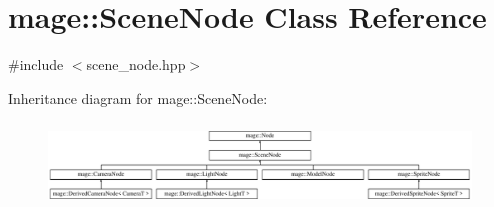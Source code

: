 \hypertarget{classmage_1_1_scene_node}{}\section{mage\+:\+:Scene\+Node Class Reference}
\label{classmage_1_1_scene_node}


{\ttfamily \#include $<$scene\+\_\+node.\+hpp$>$}

Inheritance diagram for mage\+:\+:Scene\+Node\+:\begin{figure}[H]
\begin{center}
\leavevmode
\includegraphics[height=2.240000cm]{classmage_1_1_scene_node}
\end{center}
\end{figure}
